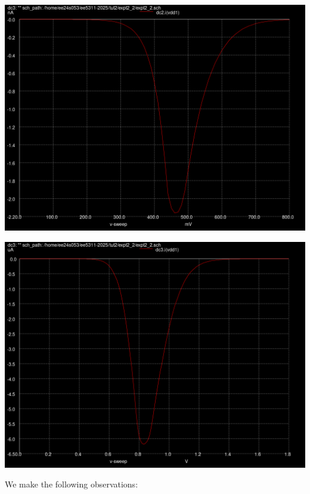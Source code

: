 \documentclass[10pt,a4paper]{article}
\begin{document}
\begin{center}
\includegraphics[scale=0.3]{tut2/reports/media/expt2_2_ids_0_8.png}
\end{center}

\begin{center}
\includegraphics[scale=0.3]{tut2/reports/media/expt2_2_ids_1_8.png}
\end{center}

We make the following observations:
\end{document}
